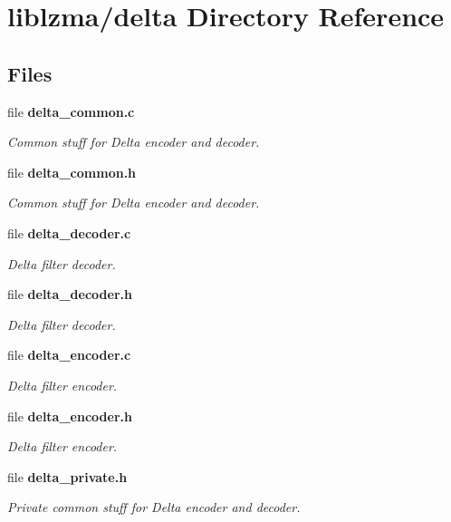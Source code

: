 \section{liblzma/delta Directory Reference}
\label{dir_bf76383f050c60e6d1da3961d5506f9e}
\subsection*{Files}
\begin{DoxyCompactItemize}
\item 
file \textbf{ delta\+\_\+common.\+c}
\begin{DoxyCompactList}\small\item\em Common stuff for Delta encoder and decoder. \end{DoxyCompactList}\item 
file \textbf{ delta\+\_\+common.\+h}
\begin{DoxyCompactList}\small\item\em Common stuff for Delta encoder and decoder. \end{DoxyCompactList}\item 
file \textbf{ delta\+\_\+decoder.\+c}
\begin{DoxyCompactList}\small\item\em Delta filter decoder. \end{DoxyCompactList}\item 
file \textbf{ delta\+\_\+decoder.\+h}
\begin{DoxyCompactList}\small\item\em Delta filter decoder. \end{DoxyCompactList}\item 
file \textbf{ delta\+\_\+encoder.\+c}
\begin{DoxyCompactList}\small\item\em Delta filter encoder. \end{DoxyCompactList}\item 
file \textbf{ delta\+\_\+encoder.\+h}
\begin{DoxyCompactList}\small\item\em Delta filter encoder. \end{DoxyCompactList}\item 
file \textbf{ delta\+\_\+private.\+h}
\begin{DoxyCompactList}\small\item\em Private common stuff for Delta encoder and decoder. \end{DoxyCompactList}\end{DoxyCompactItemize}
